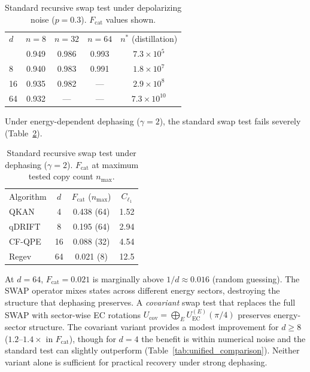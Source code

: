 \documentclass[prx,twocolumn,superscriptaddress,longbibliography,floatfix]{revtex4-2}
\begin{document}
\begin{table}[tb]
\caption{Standard recursive swap test under depolarizing noise ($p = 0.3$). $F_\mathrm{cat}$ values shown.}
\label{tab:standard_depol}
\begin{ruledtabular}
\begin{tabular}{lcccc}
$d$ & $n = 8$ & $n = 32$ & $n = 64$ & $n^*$ (distillation) \\
\colrule
4 & 0.949 & 0.986 & 0.993 & $7.3 \times 10^5$ \\
8 & 0.940 & 0.983 & 0.991 & $1.8 \times 10^7$ \\
16 & 0.935 & 0.982 & --- & $2.9 \times 10^8$ \\
64 & 0.932 & --- & --- & $7.3 \times 10^{10}$ \\
\end{tabular}
\end{ruledtabular}
\end{table}

Under energy-dependent dephasing ($\gamma = 2$), the standard swap test fails severely (Table~\ref{tab:standard_deph}).

\begin{table}[tb]
\caption{Standard recursive swap test under dephasing ($\gamma = 2$). $F_\mathrm{cat}$ at maximum tested copy count $n_\mathrm{max}$.}
\label{tab:standard_deph}
\begin{ruledtabular}
\begin{tabular}{lccc}
Algorithm & $d$ & $F_\mathrm{cat}$ ($n_\mathrm{max}$) & $C_{\ell_1}$ \\
\colrule
QKAN & 4 & 0.438 (64) & 1.52 \\
qDRIFT & 8 & 0.195 (64) & 2.94 \\
CF-QPE & 16 & 0.088 (32) & 4.54 \\
Regev & 64 & 0.021 (8) & 12.5 \\
\end{tabular}
\end{ruledtabular}
\end{table}

At $d = 64$, $F_\mathrm{cat} = 0.021$ is marginally above $1/d \approx 0.016$ (random guessing).
The SWAP operator mixes states across different energy sectors, destroying the structure that dephasing preserves.
A \emph{covariant} swap test that replaces the full SWAP with sector-wise EC rotations $U_\mathrm{cov} = \bigoplus_{E} U_\mathrm{EC}^{(E)}(\pi/4)$ preserves energy-sector structure.
The covariant variant provides a modest improvement for $d \geq 8$ ($1.2$--$1.4\times$ in $F_\mathrm{cat}$), though for $d = 4$ the benefit is within numerical noise and the standard test can slightly outperform (Table~\ref{tab:unified_comparison}).
Neither variant alone is sufficient for practical recovery under strong dephasing.
\end{document}
